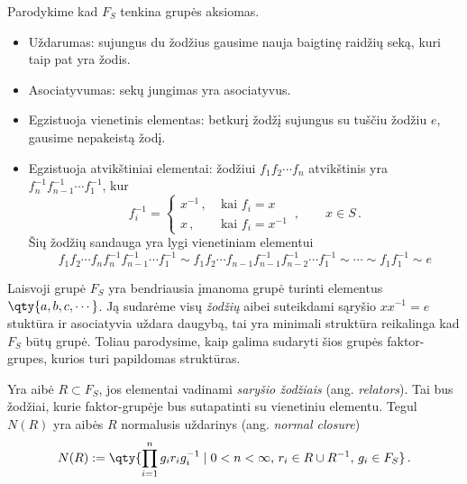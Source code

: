\begin{example}
	Parodykime kad $F_S$ tenkina grupės aksiomas.
	\begin{itemize}
		\item Uždarumas:
			sujungus du žodžius gausime nauja baigtinę raidžių seką, kuri taip pat yra žodis.
		\item Asociatyvumas:
			sekų jungimas yra asociatyvus.
		\item Egzistuoja vienetinis elementas:
			betkurį žodžį sujungus su tuščiu žodžiu $e$, gausime nepakeistą žodį.
		\item Egzistuoja atvikštiniai elementai:
			žodžiui $f_1 f_2 \cdots f_n$ atvikštinis yra $f_{n}^{-1} f_{n-1}^{-1} \cdots f_1^{-1}$,
			kur 
			\begin{equation}
				f_i^{-1}= 
				\begin{cases}
					x^{-1}\,,\;	&\text{kai } f_i=x
					\\
					x\,,		&\text{kai } f_i=x^{-1}
				\end{cases}
				\,,\qquad
				x \in S
				\,.
			\end{equation}
			Šių žodžių sandauga yra lygi vienetiniam elementui
			\begin{equation}
				f_1 f_2 \cdots f_n f_{n}^{-1} f_{n-1}^{-1} \cdots f_1^{-1}
				\sim
				f_1 f_2 \cdots f_{n-1} f_{n-1}^{-1} f_{n-2}^{-1} \cdots f_1^{-1}
				\sim \cdots \sim 
				f_1 f_1^{-1} \sim e
			\end{equation}
	\end{itemize}
\end{example}

Laisvoji grupė $F_S$ yra bendriausia įmanoma grupė turinti elementus $\qty{a, b, c, \cdots}$.
Ją sudarėme visų \emph{žodžių} aibei suteikdami sąryšio $xx^{-1}=e$ stuktūra ir asociatyvia uždara daugybą,
tai yra minimali struktūra reikalinga kad $F_S$ būtų grupė.
Toliau parodysime, kaip galima sudaryti šios grupės faktor-grupes,
kurios turi papildomas struktūras.

Yra aibė $R \subset F_S$, jos elementai vadinami \emph{saryšio žodžiais} 
(ang. \emph{relators}).
Tai bus žodžiai, kurie faktor-grupėje bus sutapatinti su vienetiniu elementu.
Tegul $N(R)$ yra aibės $R$ normalusis uždarinys (ang. \emph{normal closure})
\begin{equation}
	N(R) := \qty{
		\prod_{i=1}^n g_i r_i g_i^{-1}
		\mid
		0 < n < \infty ,\,
		r_i \in R \cup R^{-1} ,\,
		g_i \in F_S
	}
	\,.
\end{equation}


